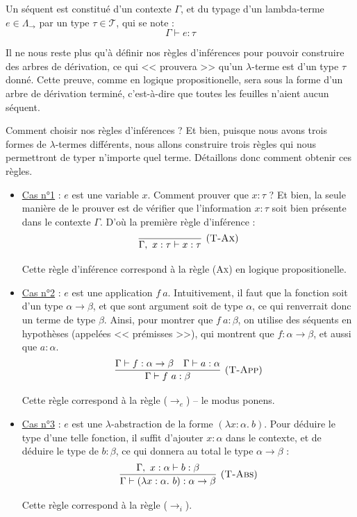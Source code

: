 \documentclass[11pt]{article}
\begin{document}
\begin{definition}
    Un séquent est constitué d'un contexte $\Gamma$, et du typage d'un lambda-terme $e\in\Lambda_\rightarrow$ par un type $\tau\in\mathcal{T}$, qui se note :
    $$\Gamma\vdash e:\tau$$
\end{definition}

Il ne nous reste plus qu'à définir nos règles d'inférences pour pouvoir construire des arbres de dérivation, ce qui << prouvera >> qu'un $\lambda$-terme est d'un type $\tau$ donné. Cette preuve, comme en logique propositionelle, sera sous la forme d'un arbre de dérivation terminé, c'est-à-dire que toutes les feuilles n'aient aucun séquent.

Comment choisir nos règles d'inférences ? Et bien, puisque nous avons trois formes de $\lambda$-termes différents, nous allons construire trois règles qui nous permettront de typer n'importe quel terme. Détaillons donc comment obtenir ces règles.

\begin{itemize}
    \item \underline{Cas n°1} : $e$ est une variable $x$. Comment prouver que $x:\tau$ ? Et bien, la seule manière de le prouver est de vérifier que l'information $x:\tau$ soit bien présente dans le contexte $\Gamma$. D'où la première règle d'inférence :
    $$
    \infer[(\text{\scshape{T-Ax}})] 
    {\Gamma,~x:\tau\vdash x:\tau}{}
    $$
    
    \begin{remark}
        Cette règle d'inférence correspond à la règle ({\scshape{Ax}}) en logique propositionelle.
    \end{remark}

    \item \underline{Cas n°2} : $e$ est une application $f~a$. Intuitivement, il faut que la fonction soit d'un type $\alpha\to\beta$, et que sont argument soit de type $\alpha$, ce qui renverrait donc un terme de type $\beta$. Ainsi, pour montrer que $f~a:\beta$, on utilise des séquents en hypothèses (appelées << prémisses >>), qui montrent que $f:\alpha\to\beta$, et aussi que $a:\alpha$.
    $$
    \infer[(\text{\scshape{T-App}})]
    {\Gamma \vdash f~a:\beta}
    {\Gamma\vdash f:\alpha\to\beta & \Gamma\vdash a:\alpha}
    $$
    
    \begin{remark}
        Cette règle correspond à la règle ($\rightarrow_e$) -- le modus ponens.
    \end{remark}

    \item \underline{Cas n°3} : $e$ est une $\lambda$-abstraction de la forme $(\lambda x:\alpha.~b)$. Pour déduire le type d'une telle fonction, il suffit d'ajouter $x:\alpha$ dans le contexte, et de déduire le type de $b:\beta$, ce qui donnera au total le type $\alpha\to\beta$ :
    $$
    \infer[(\text{\scshape{T-Abs}})]
    {\Gamma\vdash(\lambda x:\alpha.~b):\alpha\to\beta}
    {\Gamma,~x:\alpha\vdash b:\beta}
    $$

    \begin{remark}
        Cette règle correspond à la règle ($\rightarrow_i$).
    \end{remark}
\end{itemize}
\end{document}

